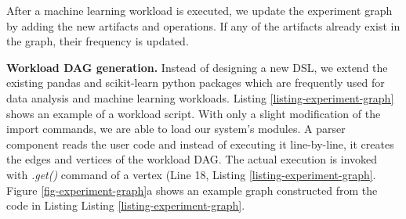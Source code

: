 After a machine learning workload is executed, we update the experiment graph by adding the new artifacts and operations.
If any of the artifacts already exist in the graph, their frequency is updated.

\textbf{Workload DAG generation.}
Instead of designing a new DSL, we extend the existing pandas \cite{mckinney-proc-scipy-2010} and scikit-learn \cite{sklearn_api} python packages which are frequently used for data analysis and machine learning workloads.
Listing \ref{listing-experiment-graph} shows an example of a workload script.
With only a slight modification of the import commands, we are able to load our system's modules.
A parser component reads the user code and instead of executing it line-by-line, it creates the edges and vertices of the workload DAG.
The actual execution is invoked with \textit{.get()} command of a vertex (Line 18, Listing \ref{listing-experiment-graph}.
Figure \ref{fig-experiment-graph}a shows an example graph constructed from the code in Listing  Listing \ref{listing-experiment-graph}.
